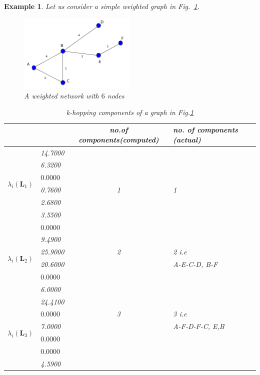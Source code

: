 \documentclass[10pt,a4paper]{article}
\newtheorem{exa}{Example}
\begin{document}
    	    \begin{exa}
    	    	Let us consider a simple weighted graph in Fig.~\ref{weighted3}.
    	    	\begin{figure}[!h]
    	    		\centering
    	    		\vspace{0pt}
    	    		\includegraphics[width= 0.5\textwidth]{images/weighted3.png}
    	    		\caption{ A weighted network with $6$ nodes} \label{weighted3}
    	    	\end{figure} 
    	    	\begin{table}[H]
    	    		\centering
    	    		\begin{tabular}{ |l|l|c|l| }
    	    			\hline
    	    			& & no.of components(computed) & no. of components (actual)\\
    	    			\hline
    	    			\multirow{6}{*}{$\lambda_i(\mathbf{L}_1)$} 
    	    			& 14.7000& & \\
    	    			& 6.3200 & & \\
    	    			& $\mathbf{0.0000}$ & & \\
    	    			& 0.7600 & 1&1 \\
    	    			& 2.6800 & & \\
    	    			& 3.5500 & & \\
    	    			\hline
    	    			\multirow{6}{*}{$\lambda_i(\mathbf{L}_2)$} 
    	    			& $\mathbf{0.0000}$& &\\
    	    			& 9.4900 & & \\
    	    			& 25.9000 &2 & 2 i.e\\
    	    			& 20.6000 & &A-E-C-D, B-F \\
    	    			& $\mathbf{0.0000}$ & & \\
    	    			& 6.0000 & & \\
    	    			\hline
    	    			\multirow{6}{*}{$\lambda_i(\mathbf{L}_3)$} 
    	    			& 24.4100& &\\
    	    			& $\mathbf{0.0000}$ &3 & 3 i.e\\
    	    			& 7.0000 & &A-F-D-F-C, E,B \\
    	    			& $\mathbf{0.0000}$ & & \\
    	    			& $\mathbf{0.0000}$ & & \\
    	    			& 4.5900& &\\
    	    			\hline
    	    		\end{tabular}   
    	    		\caption{k-hopping components of a graph in Fig.\ref{weighted3}} 
    	    		\label{tablecomponentsg3}
    	    	\end{table}
    	    	

\end{exa}
\end{document}
